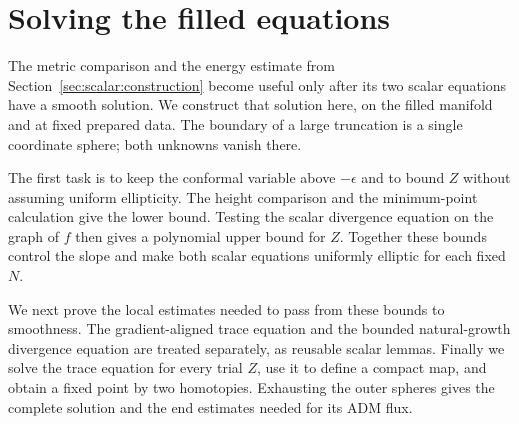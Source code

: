 \section{Solving the filled equations}
\label{sec:elliptic:construction}
\label{sec:elliptic}

The metric comparison and the energy estimate from
Section~\ref{sec:scalar:construction} become useful only after its two
scalar equations have a smooth solution.  We construct that solution
here, on the filled manifold and at fixed prepared data.  The boundary
of a large truncation is a single coordinate sphere; both unknowns
vanish there.

The first task is to keep the conformal variable above $-\epsilon$ and
to bound $Z$ without assuming uniform ellipticity.  The height comparison
and the minimum-point calculation give the lower bound.  Testing the scalar
divergence equation on the graph of $f$ then gives a polynomial upper
bound for $Z$.  Together these bounds control the slope and make both
scalar equations uniformly elliptic for each fixed $N$.

We next prove the local estimates needed to pass from these bounds to
smoothness.  The gradient-aligned trace equation and the bounded
natural-growth divergence equation are treated separately, as reusable
scalar lemmas.  Finally we solve the trace equation for every trial
$Z$, use it to define a compact map, and obtain a fixed point by two
homotopies.  Exhausting the outer spheres gives the complete solution
and the end estimates needed for its ADM flux.

